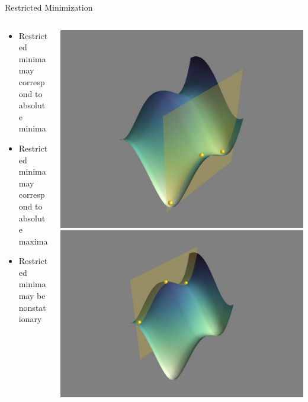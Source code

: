 \documentclass[10pt]{beamer}
\begin{document}
{{\begin{frame}{Restricted Minimization}
	\begin{columns}[c] %
		\begin{column}{.48\textwidth}
			\begin{itemize}[<+->]
				\item {Restricted minima may correspond to absolute minima}
				\item {Restricted minima may correspond to absolute maxima}
				\item {Restricted minima may be nonstationary}
			\end{itemize}				
		\end{column}
		\hfill
		\begin{column}{0.48\textwidth}
		    \begin{overprint}
			    \includegraphics[width=0.9\linewidth, trim={7cm, 2cm, 7cm, 3cm}, clip]{../images/const_opt_globalmin.jpeg}
				\onslide<2>\includegraphics[width=0.9\linewidth, trim={7cm, 1cm, 7cm, 1cm}, clip]{../images/const_opt_saddle.jpeg}

\end{overprint}
\end{column}
\end{columns}
\end{frame}}}
\end{document}
